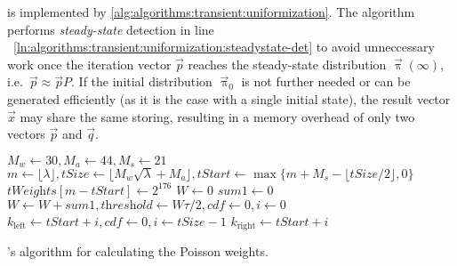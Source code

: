  is implemented by
\vref{alg:algorithms:transient:uniformization}. The algorithm performs
\emph{steady-state} detection in line%
~\ref{ln:algorithms:transient:uniformization:steadystate-det} to avoid
unneccessary work once the iteration vector $\vec{p}$ reaches the
steady-state distribution $\vec{\uppi}(\infty)$,
i.e.~$\vec{p} \approx \vec{p} P$. If the initial distribution
$\vec{\uppi}_0$ is not further needed or can be generated efficiently
(as it is the case with a single initial state), the result vector
$\vec{x}$ may share the same storing, resulting in a memory overhead
of only two vectors $\vec{p}$ and $\vec{q}$.

\begin{algorithm}
  $M_w \gets 30, M_a \gets 44, M_s \gets 21$\;
  $m \gets \lfloor \lambda \rfloor, \textit{tSize} \gets \lfloor
  M_w \sqrt{\lambda} + M_a \rfloor, \textit{tStart} \gets \max
  \{m + M_s - \lfloor \textit{tSize} / 2 \rfloor, 0 \}$\;
  \;
  $\textit{tWeights}[m - \textit{tStart}] \gets 2^{176}$\;
  $W \gets 0$\;
  $\textit{sum1} \gets 0$
  $W \gets W + \textit{sum1}, \textit{threshold} \gets W \tau / 2,
  \textit{cdf} \gets 0, i \gets 0$\;
  $k_{\text{left}} \gets \textit{tStart} + i, \textit{cdf} \gets 0, i
  \gets \textit{tSize} - 1$\;
  $k_{\text{right}} \gets \textit{tStart} + i$\;
  \;
  \;
  \caption{\citeauthor{DBLP:journals/corr/Burak14}'s algorithm for
    calculating the Poisson weights.}
  \label{alg:algorithms:transient:poisson}
\end{algorithm}

